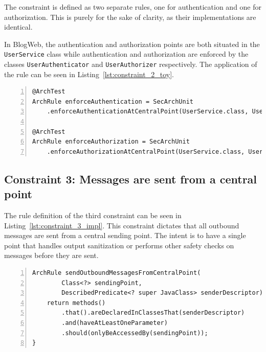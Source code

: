 The constraint is defined as two separate rules, one for authentication and one for authorization. This is purely for the sake of clarity, as their implementations are identical.

In BlogWeb, the authentication and authorization points are both situated in the \texttt{UserService} class while authentication and authorization are enforced by the classes \texttt{UserAuthenticator} and \texttt{UserAuthorizer} respectively. The application of the rule can be seen in Listing~\ref{lst:constraint_2_toy}.

\begin{minipage}{\linewidth}
\begin{lstlisting}[caption={Application of constraint 2 to BlogWeb.}, captionpos=b, label=lst:constraint_2_toy, numbers=left]
@ArchTest
ArchRule enforceAuthentication = SecArchUnit
    .enforceAuthenticationAtCentralPoint(UserService.class, UserAuthenticator.class);

@ArchTest
ArchRule enforceAuthorization = SecArchUnit
    .enforceAuthorizationAtCentralPoint(UserService.class, UserAuthorizer.class);
\end{lstlisting}
\end{minipage}

\subsection{Constraint 3: Messages are sent from a central point}
The rule definition of the third constraint can be seen in Listing~\ref{lst:constraint_3_impl}.
This constraint dictates that all outbound messages are sent from a central sending point. The intent is to have a single point that handles output sanitization or performs other safety checks on messages before they are sent. 

\begin{minipage}{\linewidth}
\begin{lstlisting}[caption={Rule definition for constraint 3.}, captionpos=b, label=lst:constraint_3_impl, numbers=left]
ArchRule sendOutboundMessagesFromCentralPoint(
        Class<?> sendingPoint,
        DescribedPredicate<? super JavaClass> senderDescriptor) {
    return methods()
        .that().areDeclaredInClassesThat(senderDescriptor)
        .and(haveAtLeastOneParameter)
        .should(onlyBeAccessedBy(sendingPoint));
}
\end{lstlisting}
\end{minipage}

